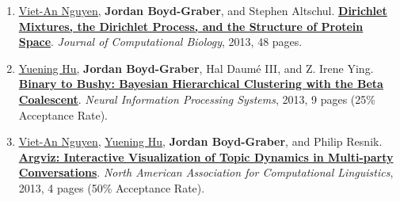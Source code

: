 \documentclass[10pt,a4paper]{article} %
\begin{document}
{\begin{enumerate}
	 \item \underline{\href{http://www.cs.umd.edu/~vietan/index.htm}{Viet-An Nguyen}}, {\bf Jordan Boyd-Graber}, and Stephen Altschul.  {\bf \href{http://cs.colorado.edu/~jbg//docs/2013_dp_protein.pdf}{Dirichlet Mixtures, the Dirichlet Process, and the Structure of Protein Space}}.  \emph{Journal of Computational Biology}, 2013, 48 pages.

	 \item \underline{\href{http://www.cs.umd.edu/~ynhu/}{Yuening Hu}}, {\bf Jordan Boyd-Graber}, Hal {Daum\'{e} III}, and Z. Irene Ying.  {\bf \href{http://cs.colorado.edu/~jbg//docs/2013_coalescent.pdf}{Binary to Bushy: Bayesian Hierarchical Clustering with the Beta Coalescent}}.  \emph{Neural Information Processing Systems}, 2013, 9 pages (25\% Acceptance Rate).

	 \item \underline{\href{http://www.cs.umd.edu/~vietan/index.htm}{Viet-An Nguyen}}, \underline{\href{http://www.cs.umd.edu/~ynhu/}{Yuening Hu}}, {\bf Jordan Boyd-Graber}, and Philip Resnik.  {\bf \href{http://cs.colorado.edu/~jbg//docs/2013_argviz.pdf}{Argviz: Interactive Visualization of Topic Dynamics in Multi-party Conversations}}.  \emph{North American Association for Computational Linguistics}, 2013, 4 pages (50\% Acceptance Rate).


\end{enumerate}
}
\end{document}
